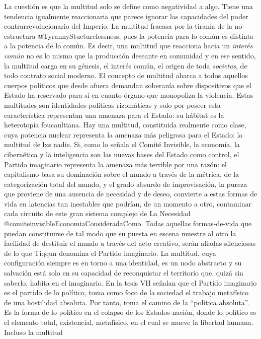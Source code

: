 \documentclass[
]{article}
\begin{document}
La cuestión es que la multitud solo se define como negatividad a algo.
Tiene una tendencia igualmente reaccionaria que parece ignorar las
capacidades del poder contrarrevolucionario del Imperio. La multitud
fracasa por la tiranía de la no-estructura @TyrannyStucturelessness,
pues la potencia para lo común es distinta a la potencia de lo común. Es
decir, una multitud que reacciona hacia un \emph{interés común} no es lo
mismo que la producción deseante en comunidad y en ese sentido, la
multitud carga en su génesis, el interés común, el origen de toda
\emph{societas}, de todo contrato social moderno. El concepto de
multitud abarca a todos aquellos cuerpos políticos que desde afuera
demandan soberanía sobre dispositivos que el Estado ha reservado para sí
en cuanto órgano que monopoliza la violencia. Estas multitudes son
identidades políticas rizomáticas y solo por poseer esta característica
representan una amenaza para el Estado: su hábitat es la heterotopía
foucaultiana. Hay una multitud, constituida realmente como clase, cuya
potencia nuclear representa la amenaza más peligrosa para el Estado: la
multitud de lxs nadie. Si, como lo señala el Comité Invisible, la
economía, la cibernética y la inteligencia son las nuevas bases del
Estado como control, el Partido imaginario representa la amenaza más
terrible por una razón: el capitalismo basa su dominación sobre el mundo
a través de la métrica, de la categorización total del mundo, y el grado
absurdo de improvisación, la pureza que proviene de una ausencia de
necesidad y de deseo, convierte a estas formas de vida en latencias tan
inestables que podrían, de un momento a otro, contaminar cada circuito
de este gran sistema complejo de La Necesidad
@comiteinvisibleEconomiaConsideradaComo. Todas aquellas formas-de-vida
que puedan constituirse de tal modo que su puesta en escena muestre al
otro la facilidad de destituir el mundo a través del acto creativo,
serán aliadas silenciosas de lo que Tiqqun denomina el Partido
imaginario. La multitud, cuya configuración siempre es en torno a una
identidad, es un nodo abstracto y su salvación está solo en su capacidad
de reconquistar el territorio que, quizá sin saberlo, habita en el
imaginario. En la tesis VII señalan que el Partido imaginario es el
partido de lo político, toma como foco de la sociedad el trabajo
metafísico de una hostilidad absoluta. Por tanto, toma el camino de la
``política absoluta''. Es la forma de lo político en el colapso de los
Estados-nación, donde lo político es el elemento total, existencial,
metafísico, en el cual se mueve la libertad humana. Incluso la multitud
\end{document}
